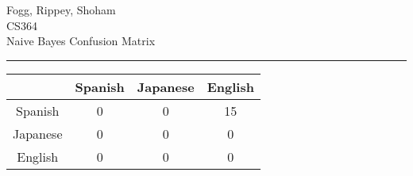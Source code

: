 \documentclass{article}
\renewcommand{\maketitle}{
  \begin{center}
    \begin{flushright}
      Fogg, Rippey, Shoham \\
      CS364 \\
      Naive Bayes Confusion Matrix
    \end{flushright}
    \rule{\linewidth}{0.1mm}
  \end{center}
}
\begin{document}
\maketitle
\begin{center}
\begin{tabular}{|c|c|c|c|}
\hline & Spanish & Japanese & English \\ \hline
Spanish & 0 & 0 & 15 \\ \hline
Japanese & 0 & 0 & 0 \\ \hline
English & 0 & 0 & 0 \\ \hline
\end{tabular}
\end{center}
\end{document}

